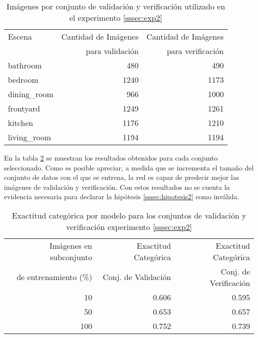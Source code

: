 \begin{table}[h!]
	\centering
	\begin{tabular}{| l | r | r |}
		\toprule
		Escena &  Cantidad de Imágenes &  Cantidad de Imágenes \\
		{} & para validación & para verificación \\
		\midrule
		bathroom &             480 &            490 \\
		bedroom &            1240 &           1173 \\
		dining\_room &             966 &           1000 \\
		frontyard &            1249 &           1261 \\
		kitchen &            1176 &           1210 \\
		living\_room &            1194 &           1194 \\
		\bottomrule
	\end{tabular}
	\caption{Imágenes por conjunto de validación y verificación utilizado en el experimento \ref{sssec:exp2}}
	\label{exp2:distribucion_clase_datasets_validation_test}
\end{table}


En la tabla \ref{exp2:results} se muestran los resultados obtenidos para cada conjunto seleccionado. Como es posible apreciar, a medida que se incrementa el tamaño del conjunto de datos con el que se entrena, la red es capaz de predecir mejor las imágenes de validación y verificación. Con estos resultados no se cuenta la evidencia necesaria para declarar la hipótesis \ref{sssec:hipotesis2} como inválida.


\begin{table}[h!]
	\centering
	\begin{tabular}{| r | r | r |}
		\toprule
		Imágenes en subconjunto & Exactitud Categórica &  Exactitud Categórica \\
		de entrenamiento (\%) & Conj. de Validación &  Conj. de Verificación \\
		\midrule
		10 & 0.606 & 0.595 \\
		50 & 0.653 & 0.657 \\
		100 & 0.752 & 0.739 \\
		\bottomrule
	\end{tabular}
	\caption{Exactitud categórica por modelo para los conjuntos de validación y verificación experimento \ref{sssec:exp2}}
	\label{exp2:results}
\end{table}



